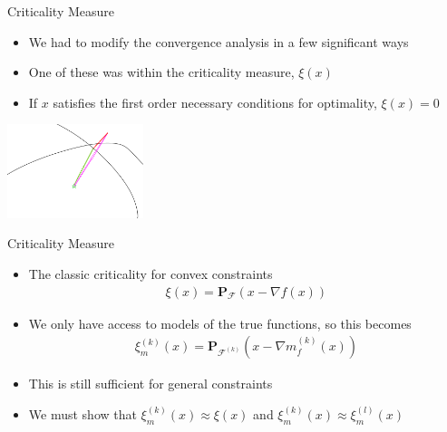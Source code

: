 \documentclass{beamer}
\newcommand{\feasible}{\mathcal F}
\newcommand{\feasiblek}{\mathcal F^{(k)}}
\newcommand{\proj}{\textbf{P}}
\begin{document}
\begin{frame}{Criticality Measure}
	\begin{itemize}
		\item We had to modify the convergence analysis in a few significant ways
		\item One of these was within the criticality measure, $\xi(x)$
		\item If $x$ satisfies the first order necessary conditions for optimality, $\xi(x) = 0$
	\end{itemize}
	\begin{center}
		\includegraphics[width=150px]{images/criticality.png}
	\end{center}
\end{frame}


\begin{frame}{Criticality Measure}
	\begin{itemize}
		\item The classic criticality for convex constraints
\begin{align*}
\xi(x) = \proj_{\feasible}\left(x - \nabla f(x)\right)
\end{align*}
		\item We only have access to models of the true functions, so this becomes
\begin{align*}
\xi_m^{(k)}(x) = \proj_{\feasiblek}\left(x - \nabla m_f^{(k)}(x)\right)
\end{align*}
		\item This is still sufficient for general constraints

\color{red}
		\item We must show that $\xi_m^{(k)}(x) \approx \xi(x)$ and $\xi_m^{(k)}(x) \approx \xi_m^{(l)}(x)$
\color{black}
	\end{itemize}
\end{frame}
\end{document}
